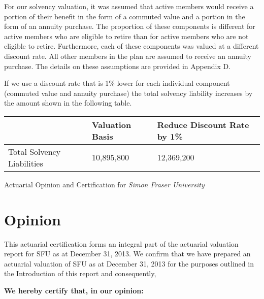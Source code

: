 \documentclass{report}
\begin{document}
For our solvency valuation, it was assumed that active members would receive a portion of their benefit in the form of a commuted value and a portion in the form of an annuity purchase. The proportion of these components is different for active members who are eligible to retire than for active members who are not eligible to retire. Furthermore, each of these components was valued at a different discount rate. All other members in the plan are assumed to receive an annuity purchase. The details on these assumptions are provided in Appendix D.

\vspace{3mm}
If we use a discount rate that is 1\% lower for each individual component (commuted value and annuity purchase) the total solvency liability increases by the amount shown in the following table.

\vspace{3mm}
\bgroup
\normalsize
\def\arraystretch{1.5}
\begin{tabular}{p{6.5cm} p{3cm} p{4.5cm}}
\hline
& Valuation Basis & Reduce Discount Rate by 1\% \\ \hline
Total Solvency Liabilities & 10,895,800 & 12,369,200 \\ \hline
\end{tabular}
\egroup



Actuarial Opinion and Certification for \textit{Simon Fraser University}

\section{Opinion}

This actuarial certification forms an integral part of the actuarial valuation report for SFU as at December 31, 2013. We confirm that we have prepared an actuarial valuation of SFU as at December 31, 2013 for the purposes outlined in the Introduction of this report and consequently,

\vspace{8mm}
\begin{center}{\bf\Large\color{bleu}We hereby certify that, in our opinion:}\end{center}
\end{document}

